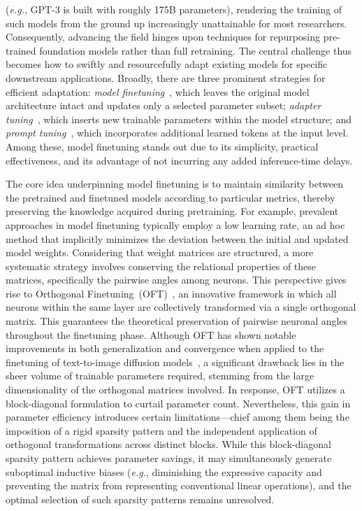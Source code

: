 (\emph{e.g.}, GPT-3 is built with roughly 175B parameters), rendering the training of such models from the ground up increasingly unattainable for most researchers. Consequently, advancing the field hinges upon techniques for repurposing pre-trained foundation models rather than full retraining. The central challenge thus becomes how to swiftly and resourcefully adapt existing models for specific downstream applications. Broadly, there are three prominent strategies for efficient adaptation: \emph{model finetuning}~\cite{hulora2022,zaken2022bitfit,guo2020parameter,raffel2020exploring,qiu2023controlling,zhang2022adaptive,chavan2023one}, which leaves the original model architecture intact and updates only a selected parameter subset; \emph{adapter tuning}~\cite{rebuffi2017learning,houlsby2019parameter,pfeiffer2020adapterfusion,lin2020exploring,he2021towards}, which inserts new trainable parameters within the model structure; and \emph{prompt tuning}~\cite{li2021prefix,lester2021power}, which incorporates additional learned tokens at the input level. Among these, model finetuning stands out due to its simplicity, practical effectiveness, and its advantage of not incurring any added inference-time delays.

The core idea underpinning model finetuning is to maintain similarity between the pretrained and finetuned models according to particular metrics, thereby preserving the knowledge acquired during pretraining. For example, prevalent approaches in model finetuning typically employ a low learning rate, an ad hoc method that implicitly minimizes the deviation between the initial and updated model weights. Considering that weight matrices are structured, a more systematic strategy involves conserving the relational properties of these matrices, specifically the pairwise angles among neurons. This perspective gives rise to Orthogonal Finetuning~(OFT)~\cite{qiu2023controlling}, an innovative framework in which all neurons within the same layer are collectively transformed via a single orthogonal matrix. This guarantees the theoretical preservation of pairwise neuronal angles throughout the finetuning phase. Although OFT has shown notable improvements in both generalization and convergence when applied to the finetuning of text-to-image diffusion models~\cite{qiu2023controlling}, a significant drawback lies in the sheer volume of trainable parameters required, stemming from the large dimensionality of the orthogonal matrices involved. In response, OFT utilizes a block-diagonal formulation to curtail parameter count. Nevertheless, this gain in parameter efficiency introduces certain limitations—chief among them being the imposition of a rigid sparsity pattern and the independent application of orthogonal transformations across distinct blocks. While this block-diagonal sparsity pattern achieves parameter savings, it may simultaneously generate suboptimal inductive biases (\emph{e.g.}, diminishing the expressive capacity and preventing the matrix from representing conventional linear operations), and the optimal selection of such sparsity patterns remains unresolved.

